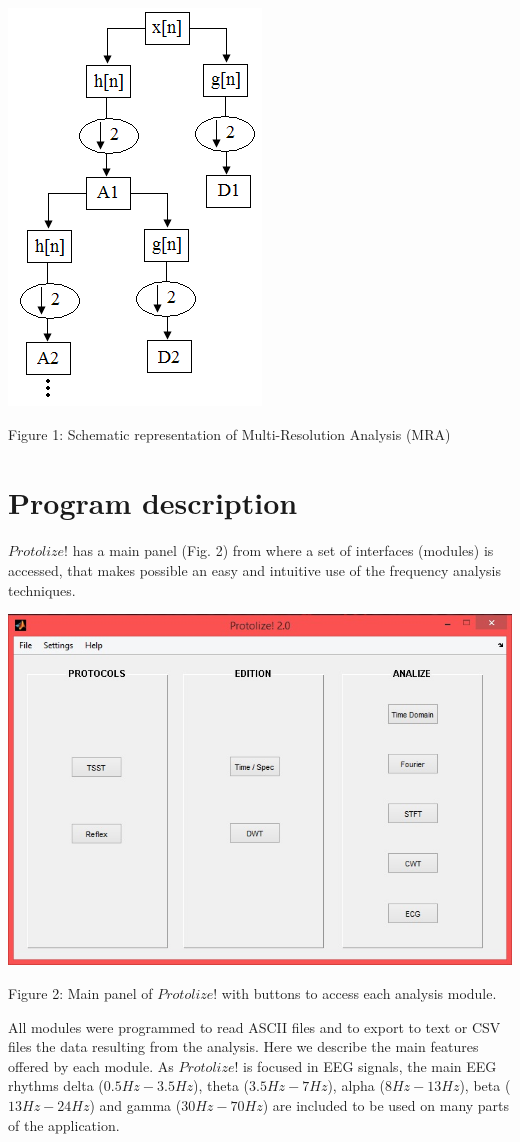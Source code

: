 \documentclass[12pt, a4paper]{article}
\begin{document}
\begin{center}
\includegraphics{image001.png}

Figure 1: Schematic representation of Multi-Resolution Analysis (MRA) 
\end{center}


\section{Program description}

$Protolize!$ has a main panel (Fig. 2) from where a set of interfaces (modules) is accessed, that makes possible an easy and intuitive use of the frequency analysis techniques. 
\begin{center}
\includegraphics[width=15cm]{image002.jpg}

Figure 2: Main panel of $Protolize!$ with buttons to access each analysis module.
\end{center}
All modules were programmed to read ASCII files and to export to text or CSV files the data resulting from the analysis. Here we describe the main features offered by each module. As $Protolize!$ is focused in EEG signals, the main EEG rhythms delta ($0.5Hz-3.5Hz$), theta ($3.5Hz-7Hz$), alpha ($8Hz-13Hz$), beta ($13Hz-24Hz$) and gamma ($30Hz-70Hz$) are included to be used on many parts of the application.
\end{document}
